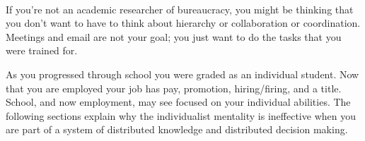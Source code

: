 \ \\

If you're not an academic researcher of bureaucracy, you might be thinking that you don't want to have to think about hierarchy or collaboration or coordination. Meetings and email are not your goal; you just want to do the tasks that you were trained for. 

As you progressed through school you were graded as an individual student. Now that you are employed your job has pay, promotion, hiring/firing, and a title. School, and now employment, may see focused on your individual abilities. The following sections explain why the individualist mentality is ineffective when you are part of a system of distributed knowledge and distributed decision making. 


